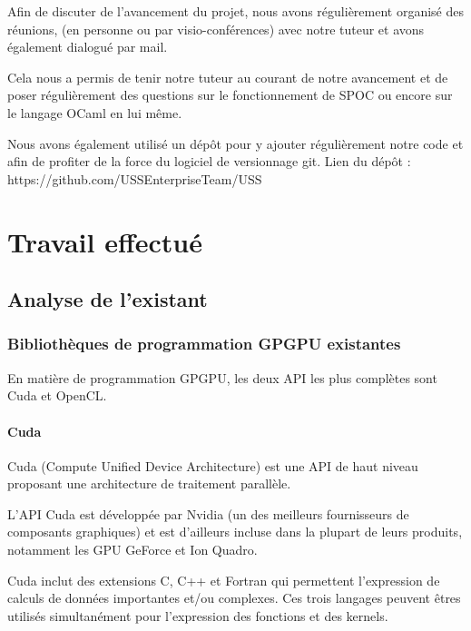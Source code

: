 \documentclass{report}
\begin{document}
Afin de discuter de l'avancement du projet, nous avons régulièrement organisé des réunions, (en personne ou par visio-conférences) avec notre tuteur et avons également dialogué par mail.\newline

Cela nous a permis de tenir notre tuteur au courant de notre avancement et de poser régulièrement des questions sur le fonctionnement de SPOC ou encore sur le langage OCaml en lui même.\newline

Nous avons également utilisé un dépôt pour y ajouter régulièrement notre code et afin de profiter de la force du logiciel de versionnage git.\newline
Lien du dépôt : https://github.com/USSEnterpriseTeam/USS

\chapter{Travail effectué}
\section{Analyse de l'existant}
\subsection{Bibliothèques de programmation GPGPU existantes}

En matière de programmation GPGPU, les deux API les plus complètes sont Cuda et OpenCL.
\subsubsection{Cuda}

Cuda (Compute Unified Device Architecture) est une API de haut niveau proposant une architecture de traitement parallèle.\newline

L'API Cuda est développée par Nvidia (un des meilleurs fournisseurs de composants graphiques) et est d'ailleurs incluse dans la plupart de leurs produits, notamment les GPU GeForce et Ion Quadro.\newline

Cuda inclut des extensions C, C++ et Fortran qui permettent l'expression de calculs de données importantes et/ou complexes.\newline
Ces trois langages peuvent êtres utilisés simultanément pour l'expression des fonctions et des kernels.\newline
\end{document}
